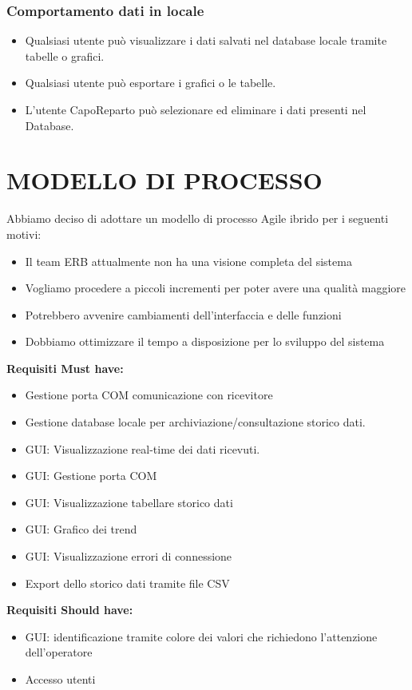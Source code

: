 \documentclass{report}
\begin{document}
\subsection{Comportamento dati in locale}
\begin{itemize}
\item Qualsiasi utente può visualizzare i dati salvati nel database locale tramite tabelle o grafici.
\item Qualsiasi utente può esportare i grafici o le tabelle.
\item L’utente CapoReparto può selezionare ed eliminare i dati presenti nel Database.
\end{itemize}





\chapter{MODELLO DI PROCESSO}
Abbiamo deciso di adottare un modello di processo Agile ibrido per i seguenti motivi:
\begin{itemize}
\item Il team ERB attualmente non ha una visione completa del sistema
\item Vogliamo procedere a piccoli incrementi per poter avere una qualità maggiore 
\item Potrebbero avvenire cambiamenti dell'interfaccia e delle funzioni
\item Dobbiamo ottimizzare il tempo a disposizione per lo sviluppo del sistema
\end{itemize}

\textbf{Requisiti Must have:}
\begin{itemize}
\item Gestione porta COM comunicazione con ricevitore
\item Gestione database locale per archiviazione/consultazione storico dati.
\item GUI: Visualizzazione real-time dei dati ricevuti.
\item GUI: Gestione porta COM 
\item GUI: Visualizzazione tabellare storico dati
\item GUI: Grafico dei trend 
\item GUI: Visualizzazione errori di connessione
\item Export dello storico dati tramite file CSV
\end{itemize}

\textbf{Requisiti Should have:}
\begin{itemize}
\item GUI: identificazione tramite colore dei valori che richiedono l'attenzione dell'operatore
\item Accesso utenti
\end{itemize}
\end{document}
